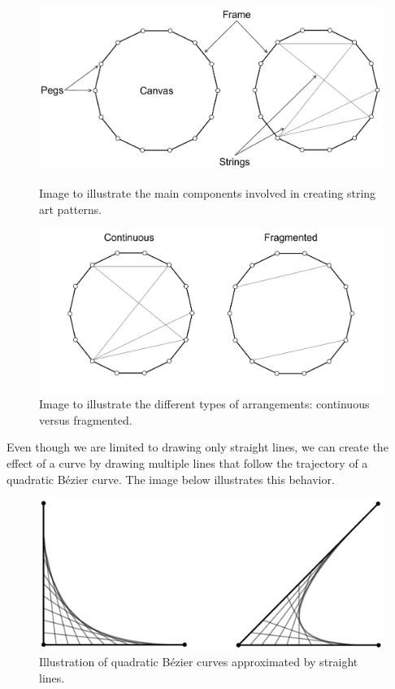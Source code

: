 \begin{figure}[!htb]
    \centering
    \begin{minipage}{0.48\linewidth}
        \centering
        \includegraphics[width=\linewidth]{images/stringart_components.pdf}
        \caption{Image to illustrate the main components involved in creating string art patterns.}
        \label{fig:stringart_components}
    \end{minipage}
    \hfill
    \begin{minipage}{0.48\linewidth}
        \centering
        \includegraphics[width=\linewidth]{images/continuous_vs_fragmented.pdf}
        \caption{Image to illustrate the different types of arrangements: continuous versus fragmented.}
        \label{fig:continuous_vs_fragmented_strings}
    \end{minipage}
\end{figure}

Even though we are limited to drawing only straight lines, we can create the effect of a curve by drawing multiple lines that follow the trajectory of a quadratic Bézier curve. The image below illustrates this behavior.

\begin{figure}[H]
    \centering
    \includegraphics[width=0.5\linewidth]{images/quadratic_bezier_curves.pdf}
    \caption{Illustration of quadratic Bézier curves approximated by straight lines.}
    \label{fig:bezier_cureves}
\end{figure}